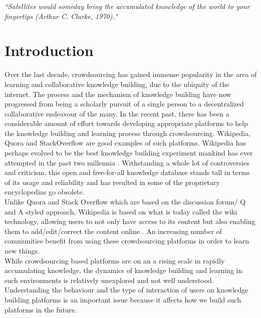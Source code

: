 \documentclass{llncs}
\begin{document}
\textit{``Satellites would someday bring the accumulated knowledge of the world to your fingertips (Arthur C. Clarke, 1970)."}
\section{Introduction}\label{sec:Introduction}
Over the last decade, crowdsourcing has gained immense popularity in the area of learning and collaborative knowledge building, due to the ubiquity of the internet\cite{Estelles-Arolas2012}. The process and the mechanism of knowledge building have now progressed from being a scholarly pursuit of a single person to a decentralized collaborative endeavour of the many.  In the recent past, there has been a considerable amount of effort towards developing appropriate platforms to help the knowledge building and learning process through crowdsourcing\cite{Beldarrain2006}\cite{Bryant2006}. Wikipedia, Quora and StackOverflow are good examples of such platforms. Wikipedia has perhaps evolved to be the best knowledge building experiment mankind has ever attempted in the past two millennia \cite{Korfiatis2006}\cite{Pentzold2006}\cite{Wagner2006}. Withstanding a whole lot of controversies and criticism, this open and free-for-all knowledge database stands tall in terms of its usage and reliability \cite{Giles2005} and has resulted in some of the proprietary encyclopedias go obsolete.\\

Unlike Quora and Stack Overflow which are based on the discussion forum/ Q and A styled approach, Wikipedia is based on what is today called the wiki technology, allowing users to not only have access to its content but also enabling them to add/edit/correct the content online \cite{Raitman2005}. An increasing number of communities benefit from using these crowdsourcing platforms in order to learn new things.\\

While crowdsourcing based platforms are on an a rising scale in rapidly accumulating knowledge\cite{Howe2006a}, the dynamics of knowledge building and learning in such environments is relatively unexplored and not well understood. Understanding the behaviour and the type of interaction of users on knowledge building platforms is an important issue because it affects how we build such platforms in the future. \\
\end{document}
